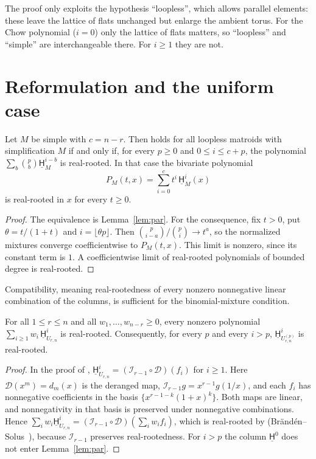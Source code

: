 \documentclass[a4paper,envcountsame,runningheads]{llncs}
\newcommand{\uH}{\underline{\mathsf H}}
\begin{document}
\begin{remark}
The proof only exploits the hypothesis ``loopless'', which allows parallel elements: these leave the lattice of flats unchanged but enlarge the ambient torus. For the Chow polynomial ($i=0$) only the lattice of flats matters, so ``loopless'' and ``simple'' are interchangeable there. For $i\ge1$ they are not.
\end{remark}

\section{Reformulation and the uniform case}

\begin{proposition}\label{prop:reform}
Let $M$ be simple with $c=n-r$. Then \cite[Conj.~1.5]{BV} holds for all loopless matroids with simplification $M$ if and only if, for every $p\ge0$ and $0\le i\le c+p$, the polynomial $\sum_b\binom pb\uH^{i-b}_M$ is real-rooted. In that case the bivariate polynomial
\[
P_M(t,x)=\sum_{i=0}^{c} t^i\,\uH^i_M(x)
\]
is real-rooted in $x$ for every $t\ge 0$.
\end{proposition}
\begin{proof}
The equivalence is Lemma~\ref{lem:par}. For the consequence, fix $t>0$, put $\theta=t/(1+t)$ and $i=\lfloor\theta p\rfloor$. Then $\binom p{i-a}/\binom pi\to t^a$, so the normalized mixtures converge coefficientwise to $P_M(t,x)$. This limit is nonzero, since its constant term is $1$. A coefficientwise limit of real-rooted polynomials of bounded degree is real-rooted.
\end{proof}

Compatibility, meaning real-rootedness of every nonzero nonnegative linear combination of the columns, is sufficient for the binomial-mixture condition.

\begin{proposition}\label{prop:unif}
For all $1\le r\le n$ and all $w_1,\dots,w_{n-r}\ge0$, every nonzero polynomial $\sum_{i\ge1}w_i\,\uH^i_{U_{r,n}}$ is real-rooted. Consequently, for every $p$ and every $i>p$, $\uH^i_{U_{r,n}^{(p)}}$ is real-rooted.
\end{proposition}
\begin{proof}
In the proof of \cite[Thm.~1.4]{BV}, $\uH^i_{U_{r,n}}=(\mathcal I_{r-1}\circ\mathcal D)(f_i)$ for $i\ge 1$. Here $\mathcal D(x^m)=d_m(x)$ is the deranged map, $\mathcal I_{r-1}g=x^{r-1}g(1/x)$, and each $f_i$ has nonnegative coefficients in the basis $\{x^{r-1-k}(1+x)^k\}$. Both maps are linear, and nonnegativity in that basis is preserved under nonnegative combinations. Hence $\sum_i w_i\uH^i_{U_{r,n}}=(\mathcal I_{r-1}\circ\mathcal D)(\sum_i w_if_i)$, which is real-rooted by \cite[Thm.~7.2]{BV} (Br\"and\'en--Solus~\cite{BS}), because $\mathcal I_{r-1}$ preserves real-rootedness. For $i>p$ the column $\uH^0$ does not enter Lemma~\ref{lem:par}.
\end{proof}
\end{document}
